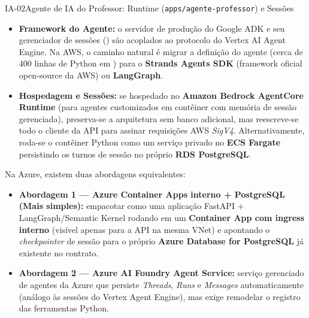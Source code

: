 \begin{pecaarq}{IA-02}{Agente de IA do Professor: Runtime (\texttt{apps/agente-professor}) e Sessões}{\sgcp~\nativo\enspace\saws~\adaptacao\enspace\sazure~\adaptacao}
\begin{campos}
\begin{itemize}
    \item \textbf{Framework do Agente:} o servidor de produção do Google ADK e seu gerenciador de sessões () são acoplados ao protocolo do Vertex AI Agent Engine. Na AWS, o caminho natural é migrar a definição do agente (cerca de 400 linhas de Python em ) para o \textbf{Strands Agents SDK} (framework oficial open-source da AWS) ou \textbf{LangGraph}.
    \item \textbf{Hospedagem e Sessões:} se hospedado no \textbf{Amazon Bedrock AgentCore Runtime} (para agentes customizados em contêiner com memória de sessão gerenciada), preserva-se a arquitetura sem banco adicional, mas reescreve-se todo o cliente  da API para assinar requisições AWS \emph{SigV4}. Alternativamente, roda-se o contêiner Python como um serviço privado no \textbf{ECS Fargate} persistindo os turnos de sessão no próprio \textbf{RDS PostgreSQL}.
  \end{itemize}
  \item[Equivalente Azure] Na Azure, existem duas abordagens equivalentes:
  \begin{itemize}
    \item \textbf{Abordagem 1 --- Azure Container Apps interno + PostgreSQL (Mais simples):} empacotar  como uma aplicação FastAPI + LangGraph/Semantic Kernel rodando em um \textbf{Container App com ingress interno} (visível apenas para a API na mesma VNet) e apontando o \emph{checkpointer} de sessão para o próprio \textbf{Azure Database for PostgreSQL} já existente no contrato.
    \item \textbf{Abordagem 2 --- Azure AI Foundry Agent Service:} serviço gerenciado de agentes da Azure que persiste \emph{Threads}, \emph{Runs} e \emph{Messages} automaticamente (análogo às sessões do Vertex Agent Engine), mas exige remodelar o registro das ferramentas Python.
  \end{itemize}
\end{campos}
\end{pecaarq}

